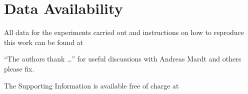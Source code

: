 \documentclass[journal=jacsat,manuscript=article]{achemso}
\begin{document}
\section{Data Availability}
All data for the experiments carried out and instructions on how to reproduce this work can be found at 

\begin{acknowledgement}

``The authors thank \ldots'' for useful discussions with Andreas Mardt and others please fix.


\end{acknowledgement}

\begin{suppinfo}
The Supporting Information is available free of charge at

\end{suppinfo}


%
\end{document}
